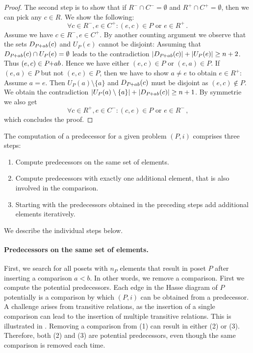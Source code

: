 \documentclass[twoside,leqno,twocolumn]{article}
\newcommand{\pchild}[3]{{#1}\kern-1pt{+}{#2}{#3}}
\newcommand{\less}[2]{D_{#1}(#2)}
\newcommand{\greater}[2]{U_{#1}(#2)}
\begin{document}
\begin{proof}
  The second step is to show that if $R^- \cap C^- = \emptyset$ and $R^+ \cap C^+ = \emptyset$, then we can pick any $c \in R$.
  We show the following:
  \begin{equation}
    \forall c \in R^-, e \in C^+ \colon (e, c) \in P \text{ or } e \in R^+\,\text{.}
  \end{equation}
  Assume we have $c \in R^-, e \in C^+$.
  By another counting argument we observe that the sets $\less{\pchild{P}{a}{b}}{c}$ and $\greater{P}{e}$ cannot be disjoint:
  Assuming that $\less{\pchild{P}{a}{b}}{c} \cap \greater{P}{e} = \emptyset$ leads to the contradiction $|\less{\pchild{P}{a}{b}}{c}| + |\greater{P}{e}| \ge n + 2$.
  Thus $(e, c) \in \pchild{P}{a}{b}$.
  Hence we have either $(e, c) \in P$ or $(e, a) \in P$.
  If $(e, a) \in P$ but not $(e, c) \in P$, then we have to show $a \neq e$ to obtain $e \in R^+$:
  Assume $a = e$.
  Then $\greater{P}{a} \setminus \{ a \}$ and $\less{\pchild{P}{a}{b}}{c}$ must be disjoint as $(e, c) \notin P$.
  We obtain the contradiction $|\greater{P}{a} \setminus \{ a \}| + |\less{\pchild{P}{a}{b}}{c}| \ge n + 1$.
  By symmetrie we also get
  \begin{equation}
    \forall c \in R^+, e \in C^- \colon (c, e) \in P \text{ or } e \in R^-\,\text{,}
  \end{equation}
  which concludes the proof.
\end{proof}

The computation of a predecessor for a given problem $(P, i)$ comprises three steps:
\begin{enumerate}
  \item Compute predecessors on the same set of elements.
  \item Compute predecessors with exactly one additional element, that is also involved in the comparison.
  \item Starting with the predecessors obtained in the preceding steps add additional elements iteratively.
\end{enumerate}
We describe the individual steps below.

\paragraph{Predecessors on the same set of elements.}
First, we search for all posets with $n_P$ elements that result in poset $P$ after inserting a comparison $a < b$.
In other words, we remove a comparison.
First we compute the potential predecessors.
Each edge in the Hasse diagram of $P$ potentially is a comparison by which $(P, i)$ can be obtained from a predecessor.
A challenge arises from transitive relations, as the insertion of a single comparison can lead to the insertion of multiple transitive relations.
This is illustrated in .
Removing a comparison from (1) can result in either (2) or (3).
Therefore, both (2) and (3) are potential predecessors, even though the same comparison is removed each time.
\end{document}
